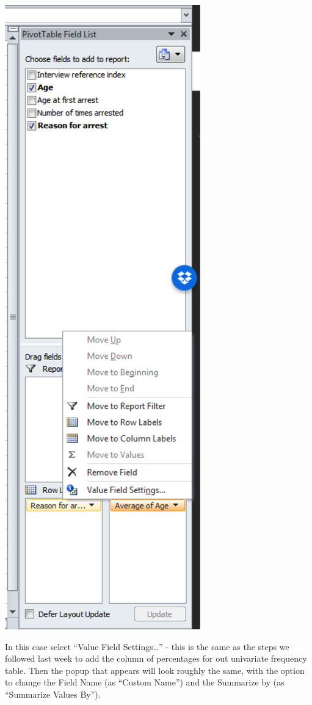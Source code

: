 \documentclass[
]{book}
\begin{document}
\includegraphics{imgs/windows_pivot_change_sum.png}

In this case select ``Value Field Settings\ldots{}'' - this is the same as the steps we followed last week to add the column of percentages for out univariate frequency table. Then the popup that appears will look roughly the same, with the option to change the Field Name (as ``Custom Name'') and the Summarize by (as ``Summarize Values By'').
\end{document}
